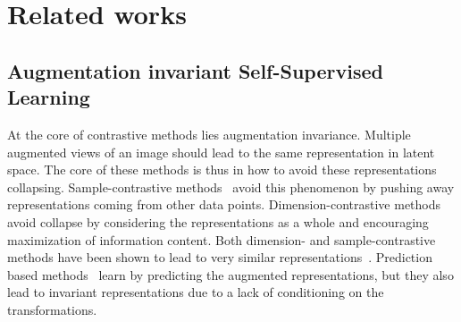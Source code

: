 \documentclass[twocolumn]{fairmeta}
\theoremstyle{plain}
\theoremstyle{definition}
\theoremstyle{remark}
\begin{document}
\section{Related works}

\subsection{Augmentation invariant Self-Supervised Learning}
At the core of contrastive methods lies augmentation invariance. Multiple augmented views of an image should lead to the same representation in latent space. The core of these methods is thus in how to avoid these representations collapsing. Sample-contrastive methods~\citep{chen2020simple,he2020moco,chen2020mocov2,caron2021dino,chen2021mocov3,yeh2021decoupled,haochen2021provable,oquab2023dinov2} avoid this phenomenon by pushing away representations coming from other data points. Dimension-contrastive methods~\citep{bardes2021vicreg,zbontar2021barlow,ermolov2021whitening,li2022neural,bardes2022vicregl} avoid collapse by considering the representations as a whole and encouraging maximization of information content. Both dimension- and sample-contrastive methods have been shown to lead to very similar representations~\citep{garrido2023duality}.
Prediction based methods~\citep{grill2020byol,chen2020simsiam} learn by predicting the augmented representations, but they also lead to invariant representations due to a lack of conditioning on the transformations.
\end{document}
